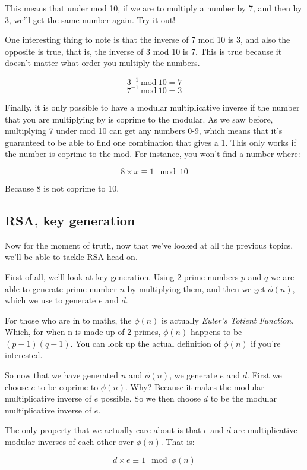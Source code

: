 \documentclass{article}
\newcommand{\inmod}{\ \text{mod}\ }
\begin{document}
  This means that under mod 10, if we are to multiply a number by 7, and then by
  3, we'll get the same number again. Try it out!

  One interesting thing to note is that the inverse of 7 mod 10 is 3, and also
  the opposite is true, that is, the inverse of 3 mod 10 is 7. This is true
  because it doesn't matter what order you multiply the numbers.

  \[ 3^{-1} \inmod 10 = 7 \]
  \[ 7^{-1} \inmod 10 = 3 \]

  Finally, it is only possible to have a modular multiplicative inverse if the
  number that you are multiplying by is coprime to the modular. As we saw before,
  multiplying 7 under mod 10 can get any numbers 0-9, which means that it's 
  guaranteed to be able to find one combination that gives a 1. This only works
  if the number is coprime to the mod. For instance, you won't find a number where:

  \[ 8 \times x \equiv 1 \mod 10 \]

  Because 8 is not coprime to 10.

  \subsection*{RSA, key generation}
  Now for the moment of truth, now that we've looked at all the previous topics,
  we'll be able to tackle RSA head on.

  First of all, we'll look at key generation. Using 2 prime numbers $p$ and $q$
  we are able to generate prime number $n$ by multiplying them, and then we get
  $\phi(n)$, which we use to generate $e$ and $d$.

  For those who are in to maths, the $\phi(n)$ is actually \textit{Euler's Totient
  Function}. Which, for when n is made up of 2 primes, $\phi(n)$ happens to be
  $(p-1)(q-1)$. You can look up the actual definition of $\phi(n)$ if you're
  interested.

  So now that we have generated $n$ and $\phi(n)$, we generate $e$ and $d$.
  First we choose $e$ to be coprime to $\phi(n)$. Why? Because it makes the
  modular multiplicative inverse of $e$ possible. So we then choose $d$ to be
  the modular multiplicative inverse of $e$.

  The only property that we actually care about is that $e$ and $d$ are multiplicative
  modular inverses of each other over $\phi(n)$. That is:

  \[ d \times e \equiv 1 \mod \phi(n) \]
  
\end{document}
